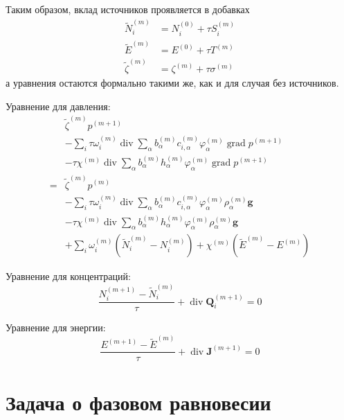 \documentclass[12pt]{article}
\renewcommand{\div}{\operatorname{div}}
\newcommand{\grad}{\operatorname{grad}}
\begin{document}
Таким образом, вклад источников проявляется в добавках
\begin{align}
\tilde N_i^{(m)} &= N_i^{(0)} + \tau S_i^{(m)}\\
\tilde E^{(m)} &= E^{(0)} + \tau T^{(m)}\\
\tilde \zeta^{(m)} &= \zeta^{(m)} + \tau\sigma^{(m)}
\end{align}
а уравнения остаются формально такими же, как и для случая без источников.

Уравнение для давления:
\begin{align*}
&\tilde \zeta^{(m)} p^{(m+1)}\\
&-\sum_i\tau\omega_i^{(m)}\div \sum_\alpha 
b_\alpha^{(m)} 
c_{i,\alpha}^{(m)} 
\varphi_\alpha^{(m)}
\grad p^{(m+1)} \\
&-\tau\chi^{(m)}\div \sum_\alpha 
b_\alpha^{(m)} 
h_{\alpha}^{(m)} 
\varphi_\alpha^{(m)}
\grad p^{(m+1)} \\
{}={}&\tilde \zeta^{(m)} p^{(m)}\\
&-\sum_i\tau\omega_i^{(m)}\div \sum_\alpha 
b_\alpha^{(m)} 
c_{i,\alpha}^{(m)} 
\varphi_\alpha^{(m)}
\rho^{(m)}_\alpha \mathbf{g}\\
&-\tau\chi^{(m)}\div \sum_\alpha 
b_\alpha^{(m)} 
h_{\alpha}^{(m)} 
\varphi_\alpha^{(m)}
\rho^{(m)}_\alpha \mathbf{g} \\
&+\sum_i \omega_i^{(m)}\left(\tilde N_i^{(m)} - N_i^{(m)}\right) + 
\chi^{(m)} \left(\tilde E^{(m)} - E^{(m)}\right)
\end{align*}

Уравнение для концентраций:
\[
\frac{N_i^{(m+1)} - \tilde N_i^{(m)}}{\tau} + \div \mathbf{Q}_i^{(m+1)} = 0
\]

Уравнение для энергии:
\[
\frac{E^{(m+1)} - \tilde E^{(m)}}{\tau} + \div \mathbf{J}^{(m+1)} = 0
\]

\section{Задача о фазовом равновесии}
\end{document}
